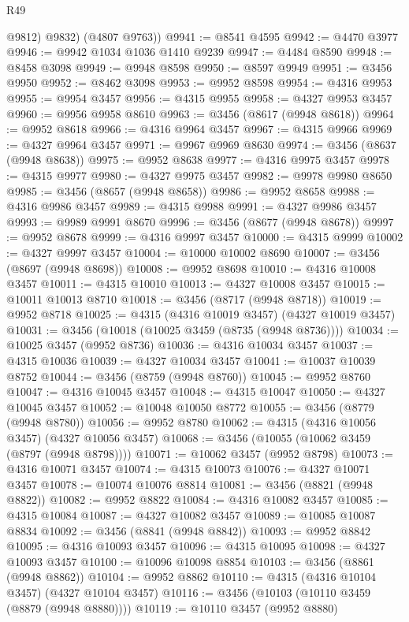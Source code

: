 \begin{lexlean}{R49}
\begin{coremodule}
          @9812)
        @9832)
      (@4807 @9763))
@9941 := @8541 @4595
@9942 := @4470 @3977
@9946 := @9942 @1034 @1036 @1410 @9239
@9947 := @4484 @8590
@9948 := @8458 @3098
@9949 := @9948 @8598
@9950 := @8597 @9949
@9951 := @3456 @9950
@9952 := @8462 @3098
@9953 := @9952 @8598
@9954 := @4316 @9953
@9955 := @9954 @3457
@9956 := @4315 @9955
@9958 := @4327 @9953 @3457
@9960 := @9956 @9958 @8610
@9963 := @3456 (@8617 (@9948 @8618))
@9964 := @9952 @8618
@9966 := @4316 @9964 @3457
@9967 := @4315 @9966
@9969 := @4327 @9964 @3457
@9971 := @9967 @9969 @8630
@9974 := @3456 (@8637 (@9948 @8638))
@9975 := @9952 @8638
@9977 := @4316 @9975 @3457
@9978 := @4315 @9977
@9980 := @4327 @9975 @3457
@9982 := @9978 @9980 @8650
@9985 := @3456 (@8657 (@9948 @8658))
@9986 := @9952 @8658
@9988 := @4316 @9986 @3457
@9989 := @4315 @9988
@9991 := @4327 @9986 @3457
@9993 := @9989 @9991 @8670
@9996 := @3456 (@8677 (@9948 @8678))
@9997 := @9952 @8678
@9999 := @4316 @9997 @3457
@10000 := @4315 @9999
@10002 := @4327 @9997 @3457
@10004 := @10000 @10002 @8690
@10007 := @3456 (@8697 (@9948 @8698))
@10008 := @9952 @8698
@10010 := @4316 @10008 @3457
@10011 := @4315 @10010
@10013 := @4327 @10008 @3457
@10015 := @10011 @10013 @8710
@10018 := @3456 (@8717 (@9948 @8718))
@10019 := @9952 @8718
@10025 := @4315 (@4316 @10019 @3457) (@4327 @10019 @3457)
@10031 := @3456 (@10018 (@10025 @3459 (@8735 (@9948 @8736))))
@10034 := @10025 @3457 (@9952 @8736)
@10036 := @4316 @10034 @3457
@10037 := @4315 @10036
@10039 := @4327 @10034 @3457
@10041 := @10037 @10039 @8752
@10044 := @3456 (@8759 (@9948 @8760))
@10045 := @9952 @8760
@10047 := @4316 @10045 @3457
@10048 := @4315 @10047
@10050 := @4327 @10045 @3457
@10052 := @10048 @10050 @8772
@10055 := @3456 (@8779 (@9948 @8780))
@10056 := @9952 @8780
@10062 := @4315 (@4316 @10056 @3457) (@4327 @10056 @3457)
@10068 := @3456 (@10055 (@10062 @3459 (@8797 (@9948 @8798))))
@10071 := @10062 @3457 (@9952 @8798)
@10073 := @4316 @10071 @3457
@10074 := @4315 @10073
@10076 := @4327 @10071 @3457
@10078 := @10074 @10076 @8814
@10081 := @3456 (@8821 (@9948 @8822))
@10082 := @9952 @8822
@10084 := @4316 @10082 @3457
@10085 := @4315 @10084
@10087 := @4327 @10082 @3457
@10089 := @10085 @10087 @8834
@10092 := @3456 (@8841 (@9948 @8842))
@10093 := @9952 @8842
@10095 := @4316 @10093 @3457
@10096 := @4315 @10095
@10098 := @4327 @10093 @3457
@10100 := @10096 @10098 @8854
@10103 := @3456 (@8861 (@9948 @8862))
@10104 := @9952 @8862
@10110 := @4315 (@4316 @10104 @3457) (@4327 @10104 @3457)
@10116 := @3456 (@10103 (@10110 @3459 (@8879 (@9948 @8880))))
@10119 := @10110 @3457 (@9952 @8880)

\end{coremodule}
\end{lexlean}
